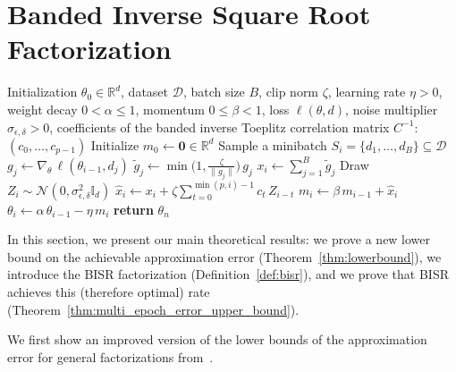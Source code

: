 \documentclass{article} %
\newcommand{\Method}{Banded Inverse Square Root Factorization\xspace}
\begin{document}
\section{\Method}



\begin{algorithm}[t]
\caption{Differentially Private SGD with Banded Inverse Matrix Factorization}
\label{alg:dp-sgd-bisr}
\begin{algorithmic}[1]
\Require Initialization $\theta_0 \in \mathbb{R}^d$, dataset $\mathcal{D}$, batch size $B$, clip norm $\zeta$, learning rate $\eta>0$, weight decay $0<\alpha\le 1$, momentum $0\le \beta<1$, loss $\ell(\theta,d)$, noise multiplier $\sigma_{\epsilon, \delta}>0$, coefficients of the banded inverse Toeplitz correlation matrix $C^{-1}$: $(c_0,\dots,c_{p-1})$
\State Initialize $m_0 \gets \mathbf{0} \in \mathbb{R}^d$
    \State Sample a minibatch $S_i = \{d_1,\dots,d_B\} \subseteq \mathcal{D}$
        \State $g_j \gets \nabla_\theta \,\ell(\theta_{i-1}, d_j)$
        \State $\tilde g_j \gets \min\!\big(1, \frac{\zeta}{\|g_j\|}\big)\, g_j$ 
    \EndFor
    \State $x_i \gets \sum_{j=1}^{B} \tilde g_j$ 
    \State Draw $Z_i \sim \mathcal{N}(0,\sigma_{\epsilon, \delta}^2 \mathbb I_d)$
    \State $\hat x_i \gets x_i + \zeta \sum_{t=0}^{\min(p, i) - 1} c_t \, Z_{i-t}$ 
    \State $m_i \gets \beta\, m_{i-1} + \hat x_i$ 
    \State $\theta_i \gets \alpha\, \theta_{i-1} - \eta\, m_i$ 
\EndFor
\State \textbf{return} $\theta_n$
\end{algorithmic}
\end{algorithm}


In this section, we present our main theoretical results: we prove a new lower bound on the achievable approximation error
(Theorem~\ref{thm:lowerbound}), we introduce the BISR factorization (Definition~\ref{def:bisr}), and we prove that 
BISR achieves this (therefore optimal) rate (Theorem~\ref{thm:multi_epoch_error_upper_bound}).


We first show an improved version of the lower bounds of the approximation error for general factorizations from~\citet{kalinin2024}.
\end{document}

